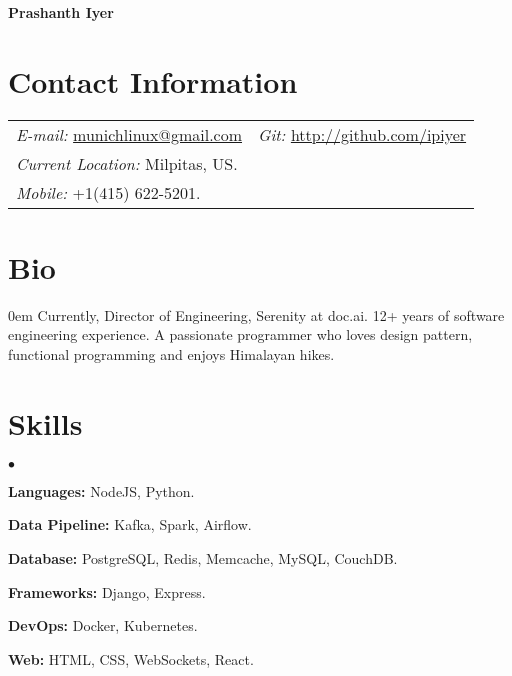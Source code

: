 \documentclass[margin, line, 10pt]{res}
\newenvironment{list2}{
  \begin{list}{$\bullet$}{%
      \setlength{\itemsep}{0in}
      \setlength{\parsep}{0in} \setlength{\parskip}{0in}
      \setlength{\topsep}{0in} \setlength{\partopsep}{0in}
      \setlength{\leftmargin}{0.2in}}}{\end{list}}
\begin{document}
 \textbf{\LARGE Prashanth Iyer}
\vspace{.1cm} \\
\begin{resume}

\section{Contact Information}
\vspace{.05in}
\begin{tabular}{@{}p{3in}p{3in}}
{\it E-mail:} \href{mailto:munichlinux@gmail.com}{munichlinux@gmail.com} & {\it Git:} \href{http://github.com/ipiyer}{http://github.com/ipiyer} \\
{\it Current Location:} Milpitas, US. \\
{\it Mobile:}  +1(415) 622-5201.
\end{tabular}

\section{Bio}
\begin{addmargin}{0em}
Currently, Director of Engineering, Serenity at doc.ai. 12+ years of software engineering experience. A passionate programmer who loves design pattern, functional programming and enjoys Himalayan hikes.\\
\end{addmargin}
\vspace{-.15in}

\section{Skills}
\begin{list2}
\item {\bf Languages:} NodeJS, Python.\\
  \vspace{-.3cm}
\item {\bf Data Pipeline:} Kafka, Spark, Airflow.\\
  \vspace{-.3cm}
\item {\bf Database:} PostgreSQL, Redis, Memcache, MySQL, CouchDB.\\
  \vspace{-.3cm}
\item {\bf Frameworks:} Django, Express.\\
  \vspace{-.3cm}
\item {\bf DevOps:} Docker, Kubernetes.\\
  \vspace{-.3cm}
\item {\bf Web:} HTML, CSS, WebSockets, React.\\
  \vspace{-.3cm}
\end{list2}


\end{resume}
\end{document}
